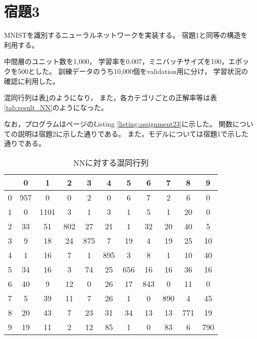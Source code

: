 \documentclass[class=jsarticle, crop=false, dvipdfmx, fleqn]{standalone}
\begin{document}
\section*{宿題3}

MNISTを識別するニューラルネットワークを実装する。
宿題1と同等の構造を利用する。

中間層のユニット数を1,000，
学習率を0.007，ミニバッチサイズを100，エポックを500とした。
訓練データのうち10,000個をvalidation用に分け，
学習状況の確認に利用した。

混同行列は表\ref{tab:confusion_matrix_NN}のようになり，
また，各カテゴリごとの正解率等は表\ref{tab:result_NN}のようになった。

なお，プログラムは\pageref{listing:assignment23}ページのListing \ref{listing:assignment23}に示した。
関数についての説明は宿題2に示した通りである。
また，モデルについては宿題1で示した通りである。

\begin{table}[H]
	\centering
	\caption{NNに対する混同行列}
	\begin{tabular}{|c||cccccccccc|} \hline
			& 0 & 1 & 2 & 3 & 4 & 5 & 6 & 7 & 8 & 9 \\ \hline\hline
        0     & 957 & 0 & 0 & 2 & 0 & 6 & 7 & 2 & 6 & 0 \\
        1     & 0 & 1101 & 3 & 1 & 3 & 1 & 5 & 1 & 20 & 0 \\
        2     & 33 & 51 & 802 & 27 & 21 & 1 & 32 & 20 & 40 & 5 \\
        3     & 9 & 18 & 24 & 875 & 7 & 19 & 4 & 19 & 25 & 10 \\
        4     & 1 & 16 & 7 & 1 & 895 & 3 & 8 & 1 & 10 & 40 \\
        5     & 34 & 16 & 3 & 74 & 25 & 656 & 16 & 16 & 36 & 16 \\
        6     & 40 & 9 & 12 & 0 & 26 & 17 & 843 & 0 & 11 & 0 \\
        7     & 5 & 39 & 11 & 7 & 26 & 1 & 0 & 890 & 4 & 45 \\
        8     & 20 & 43 & 7 & 23 & 31 & 34 & 13 & 13 & 771 & 19 \\
        9     & 19 & 11 & 2 & 12 & 85 & 1 & 0 & 83 & 6 & 790 \\
		\hline
	\end{tabular}
	\label{tab:confusion_matrix_NN}
\end{table}
\end{document}
